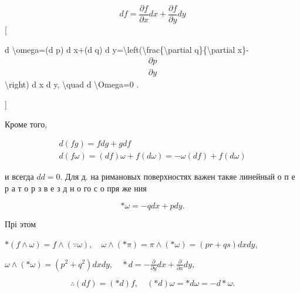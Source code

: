 \documentclass[10pt]{article}
\begin{document}
\[

d f=\frac{\partial f}{\partial x} d x+\frac{\partial f}{\partial y} d y

\][



d \textbackslash omega=(d p) d x+(d q) d y=\textbackslash left(\textbackslash frac\{\textbackslash partial q\}\{\textbackslash partial x\}-\[

\begin{array}{l}

\partial p \\

\partial y

\end{array}

\]\textbackslash right) d x d y, \textbackslash quad d \textbackslash Omega=0 .

]



Кроме того,



\[

\begin{gathered}

d(f g)=f d g+g d f \\

d(f \omega)=(d f) \omega+f(d \omega)=-\omega(d f)+f(d \omega)

\end{gathered}

\]



и всегда $d d=0$. Для д. на римановых поверхностях важен такяе линейный о п е р а т о р з в е з д н о го с о пря же ния



\[

* \omega=-q d x+p d y .

\]



Прі этом



$*(f \wedge \omega)=f \wedge(\because \omega), \quad \omega \wedge(* \pi)=\pi \wedge(* \omega)=(p r+q s) d x d y$,



$\omega \wedge(* \omega)=\left(p^{2}+q^{2}\right) d x d y, \quad * d=-\frac{\partial}{\partial y} d x+\frac{\partial}{\partial x} d y$,



\[

\therefore(d f)=(* d) f, \quad(* d) \omega=* d \omega=-d * \omega .

\]
\end{document}
